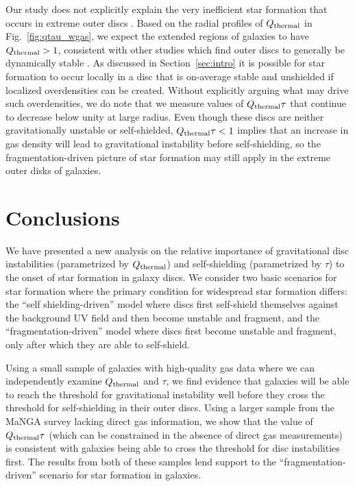 \documentclass[fleqn,usenatbib]{mnras}
\newcommand{\qh}{Q_{\rm thermal}}
\begin{document}
{Our study does not explicitly explain the very inefficient star formation that occurs in extreme outer discs \citep{Bigiel10}.  Based on the radial profiles of $\qh$ in Fig.~\ref{fig:qtau_wgas}, we expect the extended regions of galaxies to have $\qh>1$, consistent with other studies which find outer discs to generally be dynamically stable \citep{Kennicutt89, Martin01}.  As discussed in Section~\ref{sec:intro} it is possible for star formation to occur locally in a disc that is on-average stable and unshielded if localized overdensities can be created. Without explicitly arguing what may drive such overdensities, we do note that we measure values of $\qh\tau$ that continue to decrease below unity at large radius.  Even though these discs are neither gravitationally unstable or self-shielded, $\qh\tau<1$ implies that an increase in gas density will lead to gravitational instability before self-shielding, so the fragmentation-driven picture of star formation may still apply in the extreme outer disks of galaxies.

\section{Conclusions} \label{sec:conclusions}
We have presented a new analysis on the relative importance of gravitational disc instabilities (parametrized by $\qh$) and self-shielding (parametrized by $\tau$) to the onset of star formation in galaxy discs.  We consider two basic scenarios for star formation where the primary condition for widespread star formation differs: the ``self shielding-driven'' model where discs first self-shield themselves against the background UV field and then become unstable and fragment, and the ``fragmentation-driven'' model where discs first become unstable and fragment, only after which they are able to self-shield. 

Using a small sample of galaxies with high-quality gas data where we can independently examine $\qh$ and $\tau$, we find evidence that galaxies will be able to reach the threshold for gravitational instability well before they cross the threshold for self-shielding in their outer discs.  Using a larger sample from the MaNGA survey lacking direct gas information, we show that the value of $\qh\tau$ (which can be constrained in the absence of direct gas measurements) is consistent with galaxies being able to cross the threshold for disc instabilities first.  The results from both of these samples lend support to the ``fragmentation-driven'' scenario for star formation in galaxies.

}
\end{document}
